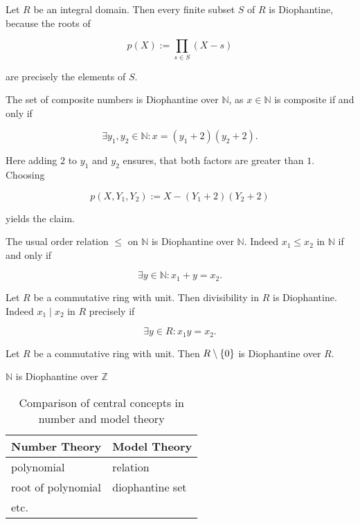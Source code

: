 \begin{exam}
  \begin{exlist}
    \item Let $R$ be an integral domain.
    Then every finite subset $S$ of $R$ is Diophantine, because the roots of

    \[ p(X) := \prod_{s ∈ S} (X - s) \]

    are precisely the elements of $S$.

    \item The set of composite numbers is Diophantine over $ℕ$, as $x ∈ ℕ$ is composite if and only if

    \[ ∃ y_1, y_2 ∈ ℕ : x = (y_1 + 2) (y_2 + 2). \]

    Here adding $2$ to $y_1$ and $y_2$ ensures, that both factors are greater than $1$.
    Choosing

    \[ p (X, Y_1, Y_2) := X - (Y_1 + 2)(Y_2 + 2) \]

    yields the claim.

    \item The usual order relation $≤$ on $ℕ$ is Diophantine over $ℕ$.
    Indeed $x_1 ≤ x_2$ in $ℕ$ if and only if

    \[ ∃ y ∈ ℕ : x_1 + y  = x_2. \]

    \item Let $R$ be a commutative ring with unit.
    Then divisibility in $R$ is Diophantine.
    Indeed $x_1 \mid x_2$ in $R$ precisely if

    \[ ∃ y ∈ R : x_1 y = x_2. \]

    \item Let $R$ be a commutative ring with unit. Then $R \setminus \left\lbrace 0 \right\rbrace$ is
    Diophantine over $R$.
    \item \label{ex:N is Diophantine over Z}
    $ℕ$ is Diophantine over $ℤ$
  \end{exlist}
\end{exam}


\begin{table}
    \begin{tabular}{l l}
        \toprule
        Number Theory          & Model Theory \\
        \midrule
        polynomial         & relation          \\
        root of polynomial & diophantine set   \\
        etc.               &                   \\
        \bottomrule
    \end{tabular}
    \caption{Comparison of central concepts in number and model theory}
\end{table}
